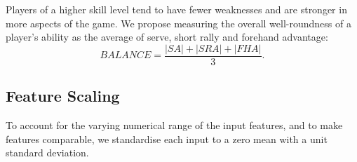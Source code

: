 Players of a higher skill level tend to have fewer weaknesses and are stronger in more aspects of the game. We propose measuring the overall well-roundness of a player's ability as the average of serve, short rally and forehand advantage:
\begin{equation}
    \textit{BALANCE} = \frac{|\textit{SA}|+|\textit{SRA}|+|\textit{FHA}|}{3}.
\end{equation}

\subsection{Feature Scaling}
To account for the varying numerical range of the input features, and to make features comparable, we standardise each input to a zero mean with a unit standard deviation.

